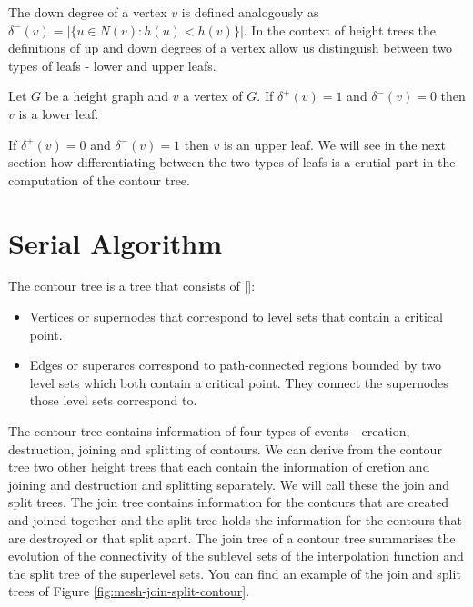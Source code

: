 The down degree of a vertex $v$ is defined analogously as $\delta^-(v) = \big|\{ u \in N(v) : h(u) < h(v) \}\big|$. In the context of height trees the definitions of up and down degrees of a vertex allow us distinguish between two types of leafs - lower and upper leafs.
\begin{defn} Let $G$ be a height graph and $v$ a vertex of $G$. If  $\delta^+(v) = 1$ and $\delta^-(v) = 0$ then $v$ is a lower leaf.  \end{defn}

If $\delta^+(v) = 0$ and $\delta^-(v) = 1$ then $v$ is an upper leaf. We will see in the next section how differentiating between the two types of leafs is a crutial part in the computation of the contour tree.

\section{Serial Algorithm}

The contour tree is a tree that consists of []:

\begin{itemize}
    \item Vertices or supernodes that correspond to level sets that contain a critical point.
    \item Edges or superarcs correspond to path-connected regions bounded by two level sets which both contain a critical point. They connect the supernodes those level sets correspond to.
\end{itemize}

The contour tree contains information of four types of events - creation, destruction, joining and splitting of contours. We can derive from the contour tree two other height trees that each contain the information of cretion and joining and destruction and splitting separately. We will call these the join and split trees. The join tree contains information for the contours that are created and joined together and the split tree holds the information for the contours that are destroyed or that split apart. The join tree of a contour tree summarises the evolution of the connectivity of the sublevel sets of the interpolation function and the split tree of the superlevel sets. You can find an example of the join and split trees of Figure \ref{fig:mesh-join-split-contour}.


